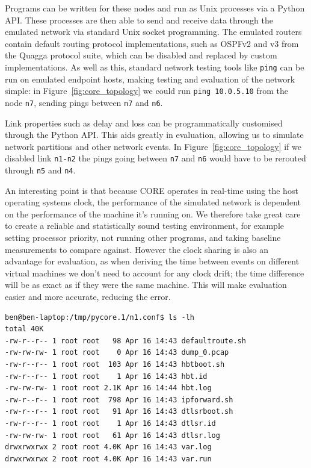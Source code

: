 \documentclass[withindex,glossary,openany]{cam-thesis}
\begin{document}
Programs can be written for these nodes and run as Unix processes via a Python API. These processes are then able to send and receive data through the emulated network via standard Unix socket programming. The emulated routers contain default routing protocol implementations, such as OSPFv2 and v3 from the Quagga protocol suite, which can be disabled and replaced by custom implementations. As well as this, standard network testing tools like \texttt{ping} can be run on emulated endpoint hosts, making testing and evaluation of the network simple: in Figure~\ref{fig:core_topology} we could run \texttt{ping 10.0.5.10} from the node \texttt{n7}, sending pings between \texttt{n7} and \texttt{n6}.

Link properties such as delay and loss can be programmatically customised through the Python API. This aids greatly in evaluation, allowing us to simulate network partitions and other network events. In Figure~\ref{fig:core_topology} if we disabled link \texttt{n1-n2} the pings going between \texttt{n7} and \texttt{n6} would have to be rerouted through \texttt{n5} and \texttt{n4}.

An interesting point is that because CORE operates in real-time using the host operating systems clock, the performance of the simulated network is dependent on the performance of the machine it's running on. We therefore take great care to create a reliable and statistically sound testing environment, for example setting processor priority, not running other programs, and taking baseline measurements to compare against. However the clock sharing is also an advantage for evaluation, as when deriving the time between events on different virtual machines we don't need to account for any clock drift; the time difference will be as exact as if they were the same machine. This will make evaluation easier and more accurate, reducing the error.

\begin{minipage}{1\textwidth} \centering
\begin{lstlisting}[label=core_filesystem, frame=tb, caption=Example of a virtualised file-system]
ben@ben-laptop:/tmp/pycore.1/n1.conf$ ls -lh
total 40K
-rw-r--r-- 1 root root   98 Apr 16 14:43 defaultroute.sh
-rw-rw-rw- 1 root root    0 Apr 16 14:43 dump_0.pcap
-rw-r--r-- 1 root root  103 Apr 16 14:43 hbtboot.sh
-rw-r--r-- 1 root root    1 Apr 16 14:43 hbt.id
-rw-rw-rw- 1 root root 2.1K Apr 16 14:44 hbt.log
-rw-r--r-- 1 root root  798 Apr 16 14:43 ipforward.sh
-rw-r--r-- 1 root root   91 Apr 16 14:43 dtlsrboot.sh
-rw-r--r-- 1 root root    1 Apr 16 14:43 dtlsr.id
-rw-rw-rw- 1 root root   61 Apr 16 14:43 dtlsr.log
drwxrwxrwx 2 root root 4.0K Apr 16 14:43 var.log
drwxrwxrwx 2 root root 4.0K Apr 16 14:43 var.run
\end{lstlisting}
\end{minipage}
\end{document}
